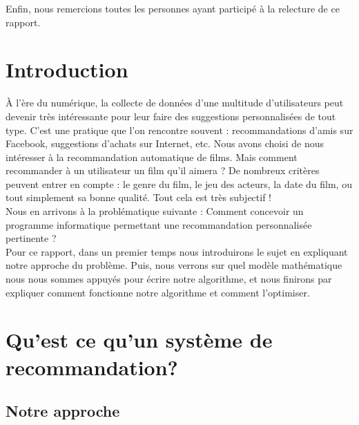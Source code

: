 \documentclass[a4paper,10pt]{article}
\begin{document}
Enfin, nous remercions toutes les personnes ayant participé à la relecture de ce rapport.
\newpage


\renewcommand{\contentsname}{Sommaire}
\tableofcontents
\newpage

\renewcommand{\thepage}{\arabic{page}}
\setcounter{page}{1}

\section*{Introduction}

À l’ère du numérique, la collecte de données d’une multitude d’utilisateurs peut devenir très intéressante pour leur faire des suggestions 
personnalisées de tout type. C’est une pratique que l’on rencontre souvent : recommandations d’amis sur Facebook, suggestions d’achats sur Internet, etc.
Nous avons choisi de nous intéresser à la recommandation automatique de films.
Mais comment recommander à un utilisateur un film qu’il aimera ? De nombreux critères peuvent entrer en compte : 
le genre du film, le jeu des acteurs, la date du film, ou tout simplement sa bonne qualité. Tout cela est très subjectif ! \\

Nous en arrivons à la problématique suivante : Comment concevoir un programme informatique permettant une recommandation personnalisée pertinente ?\\

Pour ce rapport, dans un premier temps nous introduirons le sujet en expliquant notre approche du problème. 
Puis, nous verrons sur quel modèle mathématique nous nous sommes appuyés pour écrire notre algorithme, et nous finirons par expliquer comment fonctionne notre algorithme et comment l’optimiser.

\newpage

\section{Qu'est ce qu'un système de recommandation?}

\subsection{Notre approche}
\end{document}
